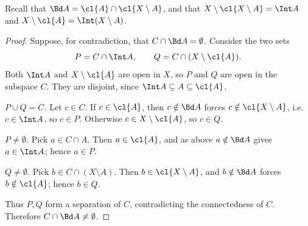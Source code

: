 
Recall that $\Bd A=\cl{A}\cap\cl{X\setminus A}$, and that
$X\setminus\cl{X\setminus A}=\Int A$ and $X\setminus\cl{A}=\Int(X\setminus A)$.

\begin{proof}
Suppose, for contradiction, that $C\cap\Bd A=\emptyset$. Consider the two sets
\[ P=C\cap\Int A,\qquad Q=C\cap(X\setminus\cl{A}). \]
Both $\Int A$ and $X\setminus\cl{A}$ are open in $X$, so $P$ and $Q$ are open in the subspace
$C$. They are disjoint, since $\Int A\subseteq A\subseteq\cl{A}$.

\emph{$P\cup Q=C$.} Let $c\in C$. If $c\in\cl{A}$, then $c\notin\Bd A$ forces
$c\notin\cl{X\setminus A}$, i.e.\ $c\in\Int A$, so $c\in P$. Otherwise $c\in X\setminus\cl{A}$,
so $c\in Q$.

\emph{$P\neq\emptyset$.} Pick $a\in C\cap A$. Then $a\in\cl{A}$, and as above $a\notin\Bd A$
gives $a\in\Int A$; hence $a\in P$.

\emph{$Q\neq\emptyset$.} Pick $b\in C\cap(X\setminus A)$. Then $b\in\cl{X\setminus A}$, and
$b\notin\Bd A$ forces $b\notin\cl{A}$; hence $b\in Q$.

Thus $P,Q$ form a separation of $C$, contradicting the connectedness of $C$. Therefore
$C\cap\Bd A\neq\emptyset$.
\end{proof}
